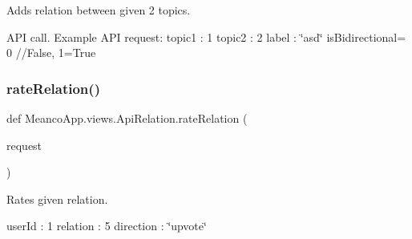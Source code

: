 Adds relation between given 2 topics. 

A\+PI call. Example A\+PI request\+: topic1 \+: 1 topic2 \+: 2 label \+: \char`\"{}asd\char`\"{} is\+Bidirectional= 0 //\+False, 1=True \hypertarget{namespace_meanco_app_1_1views_1_1_api_relation_a024057c446726ba7e55cba45c6ce116c}{}\label{namespace_meanco_app_1_1views_1_1_api_relation_a024057c446726ba7e55cba45c6ce116c} 
\subsubsection{\texorpdfstring{rate\+Relation()}{rateRelation()}}
{\footnotesize\ttfamily def Meanco\+App.\+views.\+Api\+Relation.\+rate\+Relation (\begin{DoxyParamCaption}\item[{}]{request }\end{DoxyParamCaption})}



Rates given relation. 

user\+Id \+: 1 relation \+: 5 direction \+: \char`\"{}upvote\char`\"{} 